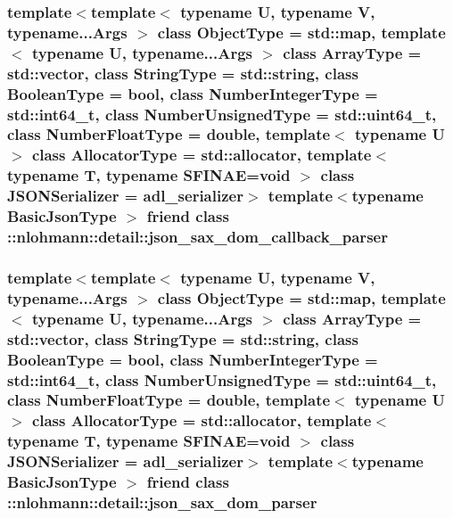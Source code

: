 \subsubsection[{\texorpdfstring{\+::nlohmann\+::detail\+::json\+\_\+sax\+\_\+dom\+\_\+callback\+\_\+parser}{::nlohmann::detail::json_sax_dom_callback_parser}}]{\setlength{\rightskip}{0pt plus 5cm}template$<$template$<$ typename U, typename V, typename...\+Args $>$ class Object\+Type = std\+::map, template$<$ typename U, typename...\+Args $>$ class Array\+Type = std\+::vector, class String\+Type  = std\+::string, class Boolean\+Type  = bool, class Number\+Integer\+Type  = std\+::int64\+\_\+t, class Number\+Unsigned\+Type  = std\+::uint64\+\_\+t, class Number\+Float\+Type  = double, template$<$ typename U $>$ class Allocator\+Type = std\+::allocator, template$<$ typename T, typename S\+F\+I\+N\+A\+E=void $>$ class J\+S\+O\+N\+Serializer = adl\+\_\+serializer$>$ template$<$typename Basic\+Json\+Type $>$ friend class \+::{\bf nlohmann\+::detail\+::json\+\_\+sax\+\_\+dom\+\_\+callback\+\_\+parser}\hspace{0.3cm}{\ttfamily [friend]}}\hypertarget{classnlohmann_1_1basic__json_a95574da8d12905ea99dc348934c837da}{}\label{classnlohmann_1_1basic__json_a95574da8d12905ea99dc348934c837da}
\subsubsection[{\texorpdfstring{\+::nlohmann\+::detail\+::json\+\_\+sax\+\_\+dom\+\_\+parser}{::nlohmann::detail::json_sax_dom_parser}}]{\setlength{\rightskip}{0pt plus 5cm}template$<$template$<$ typename U, typename V, typename...\+Args $>$ class Object\+Type = std\+::map, template$<$ typename U, typename...\+Args $>$ class Array\+Type = std\+::vector, class String\+Type  = std\+::string, class Boolean\+Type  = bool, class Number\+Integer\+Type  = std\+::int64\+\_\+t, class Number\+Unsigned\+Type  = std\+::uint64\+\_\+t, class Number\+Float\+Type  = double, template$<$ typename U $>$ class Allocator\+Type = std\+::allocator, template$<$ typename T, typename S\+F\+I\+N\+A\+E=void $>$ class J\+S\+O\+N\+Serializer = adl\+\_\+serializer$>$ template$<$typename Basic\+Json\+Type $>$ friend class \+::{\bf nlohmann\+::detail\+::json\+\_\+sax\+\_\+dom\+\_\+parser}\hspace{0.3cm}{\ttfamily [friend]}}\hypertarget{classnlohmann_1_1basic__json_a47aabb1eceae32e8a6e8e7f0ff34be60}{}\label{classnlohmann_1_1basic__json_a47aabb1eceae32e8a6e8e7f0ff34be60}
